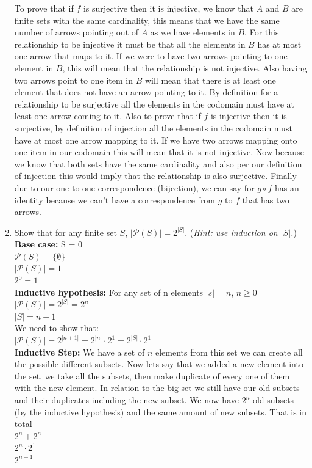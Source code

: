\documentclass[12pt]{article}
\begin{document}
\begin{enumerate}
To prove that if $f$ is surjective then it is injective, we know that $A$ and $B$ are finite sets with the same cardinality, this means that we have the same number of arrows pointing out of $A$ as we have elements in $B$. For this relationship to be injective it must be that all the elements in $B$ has at most one arrow that maps to it. If we were to have two arrows pointing to one element in $B$, this will mean that the relationship is not injective. Also having two arrows point to one item in $B$ will mean that there is at least one element that does not have an arrow pointing to it. By definition for a relationship to be surjective all the elements in the codomain must have at least one arrow coming to it. Also to prove that if $f$ is injective then it is surjective, by definition of injection all the elements in the codomain must have at most one arrow mapping to it. If we have two arrows mapping onto one item in our codomain this will mean that it is not injective. Now because we know that both sets have the same cardinality and also per our definition of injection this would imply that the relationship is also surjective. Finally due to our one-to-one correspondence (bijection), we can say for $g \circ f$ has an identity because we can't have a correspondence from $g$ to $f$ that has two arrows.

\item Show that for any finite set $S$, $|\mathcal{P}(S)|=2^{|S|}$. (\emph{Hint: use induction on $|S|$.}) \\

\textbf{Base case: } S = 0 \\
    $\mathcal{P}{( S )} = \{ \emptyset \}$ \\
    $|\mathcal{P}{( S )}| = 1$ \\
    $2^{0} = 1$ \\
    \textbf{Inductive hypothesis: } For any set of n elements $|s| = n$, $n \geq 0 $ \\
    $|\mathcal{P}{( S )}| = 2^{|S|} = 2^n$ \\
    $|S| = n + 1$\\
    We need to show that: \\
    $|\mathcal{P}{( S )}| = 2^{|n+1|}= 2^{|n|} \cdot 2^{1} = 2^{|S|} \cdot 2^{1}$ \\
    \textbf{Inductive Step: } We have a set of $n$ elements  
    from this set we can create all the possible different subsets. Now lets say that we added a new 
    element into the set, we take all the subsets, then  make duplicate of every one of them with the new element. In relation to the big set  we still have our old subsets and their duplicates including the new subset. We now have $2^{n}$ old subsets (by the inductive hypothesis) and the same amount of new subsets. That is in total\\
    $2^{n} + 2^{n}$ \\
    $2^{n} \cdot 2^{1}$ \\
    $2^{n+1}$


\end{enumerate}
\end{document}
